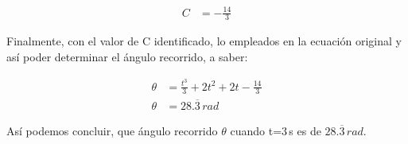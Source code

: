 \documentclass[11pt,letterpaper]{article}
\begin{document}
\begin{align}
C &= -\frac{14}{3}
\end{align}

Finalmente, con el valor de C identificado, lo empleados en la ecuación original y así poder determinar el ángulo recorrido, a saber:

\begin{align}
\theta &= \frac{t^3}{3} + 2t^2 + 2t - \frac{14}{3}\\
\theta &= 28.\overline{3}\,rad
\end{align}

Así podemos concluir, que ángulo recorrido $\theta$ cuando t=3\,s es de $28.\overline{3}\,rad$.

\end{document}
